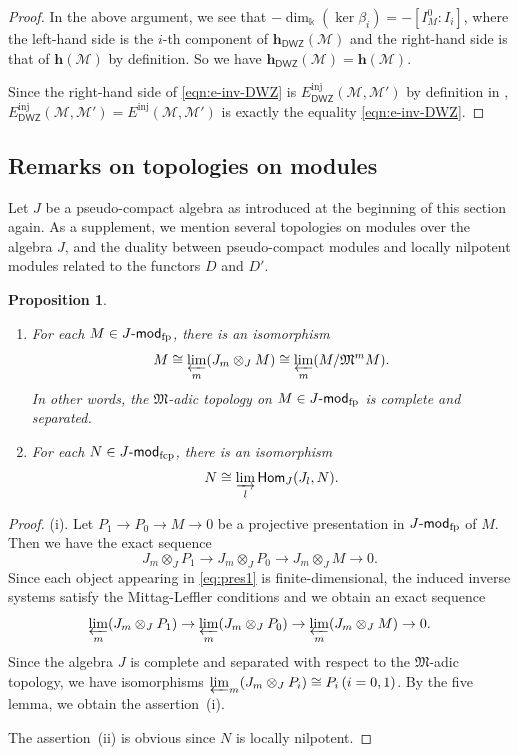 \documentclass[12pt]{amsart}
\newtheorem{proposition}[theorem]{Proposition}
\theoremstyle{definition}
\theoremstyle{remark}
\numberwithin{equation}{section}
\newcommand{\opname}[1]{\operatorname{\mathsf{#1}}}
\newcommand{\Hom}{\opname{Hom}}
\newcommand{\modfp}{\mathchar`-\mathsf{mod}_{\mathrm{fp}}}
\newcommand{\modfcp}{\mathchar`-\mathsf{mod}_{\mathrm{fcp}}}
\newcommand{\fM}{\mathfrak{M}}
\newcommand{\DWZ}{\mathsf{DWZ}}
\begin{document}
\begin{proof}
  
   
    
    In the above argument, we see that $- \dim_\Bbbk(\ker\beta_i)=-[I_M^0:I_i]$,
    where the left-hand side is the $i$-th component of $\mathbf{h}_\DWZ(\mathcal{M})$ and the right-hand side is that of $\mathbf{h}(\mathcal{M})$ by definition. So we have $\mathbf{h}_\DWZ(\mathcal{M})=\mathbf{h}(\mathcal{M})$.

Since the right-hand side of \eqref{eqn:e-inv-DWZ} is $E^{\mathrm{inj}}_\DWZ(\mathcal{M}, \mathcal{M}')$ by definition in \cite[\S7]{DWZ10},   $E^{\mathrm{inj}}_\DWZ(\mathcal{M}, \mathcal{M}')=E^{\mathrm{inj}}(\mathcal{M}, \mathcal{M}')$ is exactly the equality \eqref{eqn:e-inv-DWZ}. 
    \end{proof}


\subsection{Remarks on topologies on modules}
Let $J$ be a pseudo-compact algebra as introduced at the beginning of this section again.
As a supplement, we mention several topologies on modules over the algebra $J$, and the duality between pseudo-compact modules and locally nilpotent modules related to the functors $D$ and $D'$.
\begin{proposition}\label{lem:limisom}
    \begin{enumerate}
        \item[(i)] For each $M\in J\modfp$, there is an isomorphism
        \[M\cong \varprojlim_m (J_m\otimes_J M)\cong \varprojlim_m (M/\fM^m M).\]
        In other words, the $\fM$-adic topology on $M\in J\modfp$ is complete and separated.
        \item[(ii)] For each $N\in J\modfcp$, there is an isomorphism
        \[N\cong \varinjlim_l \Hom_J(J_l, N).\]  
    \end{enumerate}
\end{proposition}
\begin{proof}
        (i). Let $P_1 \to P_0 \to M \to 0$ be a projective presentation in $J\modfp$ of $M$. Then we have the exact sequence
        \begin{equation}\label{eq:pres1}
            J_m\otimes_J P_1 \to J_m\otimes_J P_0 \to J_m\otimes_J M \to 0.
        \end{equation}
        Since each object appearing in \eqref{eq:pres1} is finite-dimensional, the induced inverse systems satisfy the Mittag-Leffler conditions and we obtain an exact sequence
        \[\varprojlim_m (J_m\otimes_J P_1) \to \varprojlim_m (J_m\otimes_J P_0) \to \varprojlim_m (J_m\otimes_J M) \to 0.\]
        Since the algebra $J$ is complete and separated with respect to the $\fM$-adic topology, we have isomorphisms $\varprojlim_m (J_m \otimes_J P_i) \cong P_i\,(i=0, 1)$. By the five lemma, we obtain the assertion~(i).

        
        The assertion~(ii) is obvious since $N$ is locally nilpotent.
    \end{proof}
\end{document}
